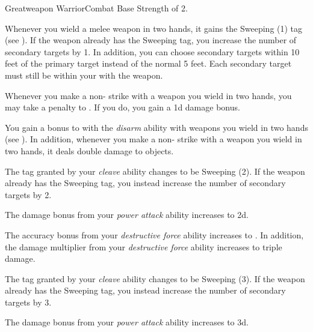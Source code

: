     \begin{feat}{Greatweapon Warrior}{Combat}
        \featpre Base Strength of 2.

         Whenever you wield a melee weapon in two hands, it gains the Sweeping (1) tag (see ).
        If the weapon already has the Sweeping tag, you increase the number of secondary targets by 1.
        In addition, you can choose secondary targets within 10 feet of the primary target instead of the normal 5 feet.
        Each secondary target must still be within your  with the weapon.

         Whenever you make a non- strike with a weapon you wield in two hands, you may take a  penalty to .
        If you do, you gain a \plus1d damage bonus.

         You gain a  bonus to  with the \textit{disarm} ability with weapons you wield in two hands (see ).
        In addition, whenever you make a non- strike with a weapon you wield in two hands, it deals double damage to objects.

         The tag granted by your \textit{cleave} ability changes to be Sweeping (2).
        If the weapon already has the Sweeping tag, you instead increase the number of secondary targets by 2.

         The damage bonus from your \textit{power attack} ability increases to \plus2d.

         The accuracy bonus from your \textit{destructive force} ability increases to .
        In addition, the damage multiplier from your \textit{destructive force} ability increases to triple damage.

         The tag granted by your \textit{cleave} ability changes to be Sweeping (3).
        If the weapon already has the Sweeping tag, you instead increase the number of secondary targets by 3.

         The damage bonus from your \textit{power attack} ability increases to \plus3d.
    \end{feat}

